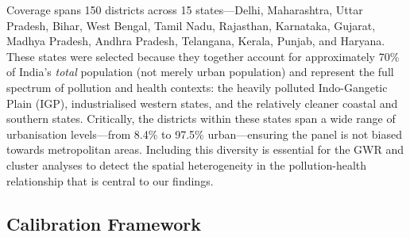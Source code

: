 \documentclass{article}
\begin{document}
\begin{table}[ht]
  \caption{Dataset summary.}
  \label{tab:data}
  \centering
  \small
\end{table}

Coverage spans 150 districts across 15 states---Delhi, Maharashtra, Uttar Pradesh, Bihar,
West Bengal, Tamil Nadu, Rajasthan, Karnataka, Gujarat, Madhya Pradesh, Andhra Pradesh,
Telangana, Kerala, Punjab, and Haryana. These states were selected because they together
account for approximately 70\% of India's \emph{total} population (not merely urban
population) and represent the full spectrum of pollution and health contexts: the heavily
polluted Indo-Gangetic Plain (IGP), industrialised western states, and the relatively
cleaner coastal and southern states. Critically, the districts within these states span a
wide range of urbanisation levels---from 8.4\% to 97.5\% urban---ensuring the panel is not
biased towards metropolitan areas. Including this diversity is essential for the GWR and
cluster analyses to detect the spatial heterogeneity in the pollution-health relationship
that is central to our findings.

\subsection{Calibration Framework}
\label{sec:calibration}
\end{document}

